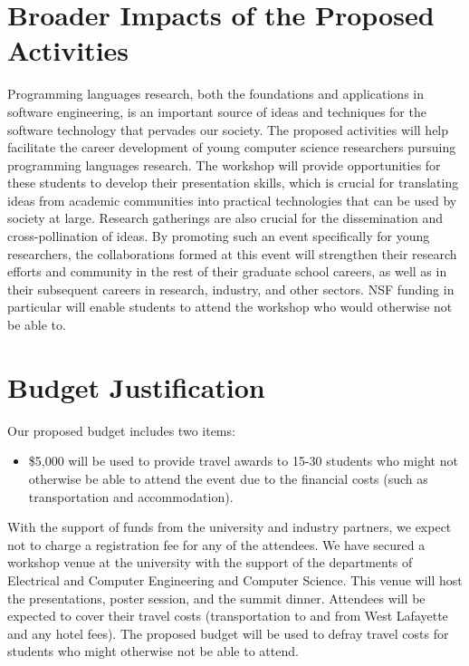 \documentclass[11pt]{article}
\begin{document}
\section{Broader Impacts of the Proposed Activities}

Programming languages research, both the foundations and applications
in software engineering, is an important source of ideas and
techniques for the software technology that pervades our society.
The proposed activities will help facilitate the career development of
young computer science researchers pursuing programming languages
research. The workshop will provide opportunities for these students
to develop their presentation skills, which is crucial for translating
ideas from academic communities into practical technologies that can
be used by society at large. Research gatherings are also crucial for
the dissemination and cross-pollination of ideas. By promoting such an
event specifically for young researchers, the collaborations formed at
this event will strengthen their research efforts and community in the
rest of their graduate school careers, as well as in their subsequent
careers in research, industry, and other sectors.
NSF funding in particular will enable students to attend the workshop
who would otherwise not be able to.






\newpage

\setcounter{page}{1}


\section*{Budget Justification}

Our proposed budget includes two items:

\begin{itemize}

\item \$5,000 will be used to provide travel awards to 15-30 students who
might not otherwise be able to attend the event due to the financial
costs (such as transportation and accommodation).

\end{itemize}

\noindent
With the support of funds from the university and industry partners, we expect not to charge a
registration fee for any of the attendees. We have secured
a workshop venue at the university with the support of the departments of Electrical and Computer Engineering and Computer Science. This venue will host the presentations, poster session, and the summit dinner. Attendees
will be expected to cover their travel costs (transportation to and
from West Lafayette and any hotel fees). The proposed budget will be used to defray travel costs for students who might otherwise not be able to attend.
\end{document}
